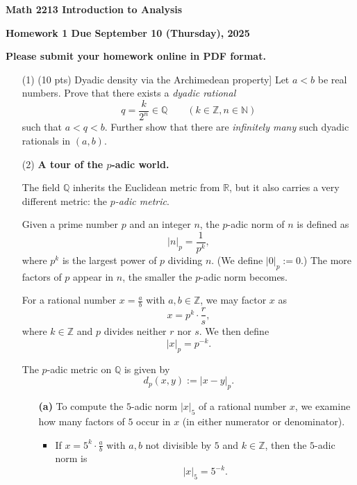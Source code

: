 \documentclass[12pt]{amsart}
\theoremstyle{definition}
\theoremstyle{remark}
\begin{document}
\begin{CJK}{UTF8}{bkai}

{\centerline{\bf Math 2213 Introduction to Analysis  }}

{\centerline{\bf Homework 1  Due   September 10 (Thursday), 2025}}

{\centerline{\bf Please submit your homework online in PDF format.}}


 
\begin{enumerate}

\item[(1)] (10 pts) Dyadic density via the Archimedean property]
\label{ex:dyadic-density}
Let $a<b$ be real numbers. Prove that there exists a \emph{dyadic rational}
\[
q=\frac{k}{2^n}\in\mathbb{Q}\qquad(k \in \mathbb{Z},n\in\mathbb{N})
\]
such that $a<q<b$.
Further show that there are \emph{infinitely many} such dyadic rationals in $(a,b)$.
\vfill
\bigskip



\item[(2)] \textbf{A tour of the $p$-adic world.}

The field $\mathbb{Q}$ inherits the Euclidean metric from $\mathbb{R}$, but it also carries 
a very different metric: the \emph{$p$-adic metric}. 

\medskip

Given a prime number $p$ and an integer $n$, the $p$-adic norm of $n$ is defined as
\[
|n|_p = \frac{1}{p^k},
\]
where $p^k$ is the largest power of $p$ dividing $n$.  
(We define $|0|_p := 0$.)  
The more factors of $p$ appear in $n$, the smaller the $p$-adic norm becomes. 

\medskip

For a rational number $x=\tfrac{a}{b}$ with $a,b\in\mathbb{Z}$, we may factor $x$ as
\[
x = p^k \cdot \frac{r}{s},
\]
where $k \in \mathbb{Z}$ and $p$ divides neither $r$ nor $s$. We then define
\[
|x|_p = p^{-k}.
\]

\medskip

The $p$-adic metric on $\mathbb{Q}$ is given by
\[
d_p(x,y) := |x-y|_p.
\]

\begin{enumerate}

\item[\textbf{(a)}] To compute the $5$-adic norm $|x|_5$ of a rational number $x$, 
we examine how many factors of $5$ occur in $x$ (in either numerator or denominator).

\begin{itemize}
\item If $x=5^k \cdot \tfrac{a}{b}$ with $a,b$ not divisible by $5$ and $k\in \mathbb{Z}$, 
then the $5$-adic norm is
\[
|x|_5 = 5^{-k}.
\]


\end{itemize}
\end{enumerate}
\end{enumerate}
\end{CJK}
\end{document}
